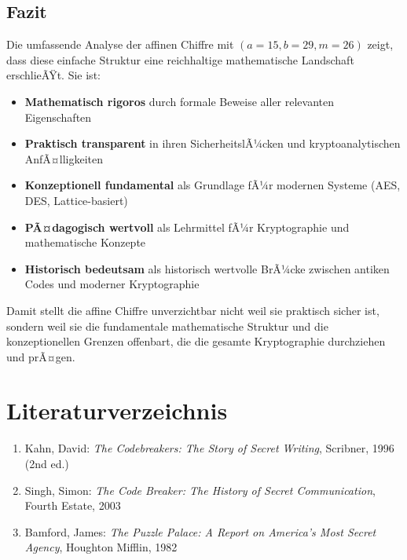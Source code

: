 ﻿\documentclass[12pt,a4paper]{article}
\begin{document}
	\subsection{Fazit}
	
	Die umfassende Analyse der affinen Chiffre mit $(a=15, b=29, m=26)$ zeigt, dass diese einfache Struktur eine reichhaltige mathematische Landschaft erschlieÃŸt. Sie ist:
	
	\begin{itemize}
		\item \textbf{Mathematisch rigoros} durch formale Beweise aller relevanten Eigenschaften
		\item \textbf{Praktisch transparent} in ihren SicherheitslÃ¼cken und kryptoanalytischen AnfÃ¤llig\-keiten
		\item \textbf{Konzeptionell fundamental} als Grundlage fÃ¼r modernen Systeme (AES, DES, Lattice-basiert)
		\item \textbf{PÃ¤dagogisch wertvoll} als Lehrmittel fÃ¼r Kryptographie und mathematische Konzepte
		\item \textbf{Historisch bedeutsam} als historisch wertvolle BrÃ¼cke zwischen antiken Codes und moderner Kryptographie
	\end{itemize}
	
	Damit stellt die affine Chiffre unverzichtbar nicht weil sie praktisch sicher ist, sondern weil sie die fundamentale mathematische Struktur und die konzeptionellen Grenzen offenbart, die die gesamte Kryptographie durchziehen und prÃ¤gen.
	
	
	\section*{Literaturverzeichnis}
	
	\begin{enumerate}
		\item Kahn, David: \textit{The Codebreakers: The Story of Secret Writing}, Scribner, 1996 (2nd ed.)
		\item Singh, Simon: \textit{The Code Breaker: The History of Secret Communication}, Fourth Estate, 2003
		\item Bamford, James: \textit{The Puzzle Palace: A Report on America's Most Secret Agency}, Houghton Mifflin, 1982
	\end{enumerate}
	
\end{document}
